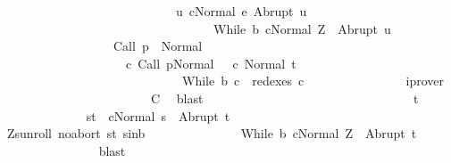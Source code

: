 \begin{isabellebody}
\ \ \ \ \ \ \ \ \ \ \ \ \ \ \ \ \ \ \ \ \ \ \ \ \ \ \ \ {\isacharparenleft}{\isasymforall}u{\isachardot}\ {\isasymGamma}{\isasymturnstile}{\isasymlangle}c{\isacharcomma}Normal\ e{\isasymrangle}\ {\isasymRightarrow}Abrupt\ u\ {\isasymlongrightarrow}\ \isanewline
\ \ \ \ \ \ \ \ \ \ \ \ \ \ \ \ \ \ \ \ \ \ \ \ \ \ \ \ \ \ \ \ \ \ {\isasymGamma}{\isasymturnstile}{\isasymlangle}While\ b\ c{\isacharcomma}Normal\ Z{\isasymrangle}\ {\isasymRightarrow}\ Abrupt\ u{\isacharparenright}{\isacharparenright}\ {\isasymand}\isanewline
\ \ \ \ \ \ \ \ \ \ \ \ \ \ \ \ \ \ {\isasymGamma}{\isasymturnstile}Call\ p\ {\isasymdown}\ Normal\ {\isasymsigma}\ {\isasymand}\isanewline
\ \ \ \ \ \ \ \ \ \ \ \ \ \ \ \ \ \ \ \ {\isacharparenleft}{\isasymexists}c{\isacharprime}{\isachardot}\ {\isasymGamma}{\isasymturnstile}{\isacharparenleft}Call\ p{\isacharcomma}Normal\ {\isasymsigma}{\isacharparenright}\ {\isasymrightarrow}\isactrlsup {\isacharplus}\ {\isacharparenleft}c{\isacharprime}{\isacharcomma}\ Normal\ t{\isacharparenright}\ {\isasymand}\ \isanewline
\ \ \ \ \ \ \ \ \ \ \ \ \ \ \ \ \ \ \ \ \ \ \ \ \ \ \ \ \ While\ b\ c\ {\isasymin}\ redexes\ c{\isacharprime}{\isacharparenright}{\isachardoublequoteclose}\isanewline
\ \ \ \ \ \ \ \ \ \ \ \ \ \ \isamarkupfalse%
\ iprover\isanewline
\ \ \ \ \ \ \ \ \ \ \isacommand{{\isacharbraceright}}\isamarkupfalse%
\isanewline
\ \ \ \ \ \ \ \ \ \ \isamarkupfalse%
\ \isamarkupfalse%
\ {\isacharquery}C{}\ \isamarkupfalse%
\ blast\isanewline
\ \ \ \ \ \ \ \ \isamarkupfalse%
\isanewline
\ \ \ \ \ \ \ \ \ \ \isacommand{{\isacharbraceleft}}\isamarkupfalse%
\isanewline
\ \ \ \ \ \ \ \ \ \ \ \ \isamarkupfalse%
\ t\isanewline
\ \ \ \ \ \ \ \ \ \ \ \ \isamarkupfalse%
\ s{\isacharunderscore}t{\isacharcolon}\ \ {\isachardoublequoteopen}{\isasymGamma}{\isasymturnstile}{\isasymlangle}c{\isacharcomma}Normal\ s{\isasymrangle}\ {\isasymRightarrow}\ Abrupt\ t{\isachardoublequoteclose}\ \isanewline
\ \ \ \ \ \ \ \ \ \ \ \ \isamarkupfalse%
\ Z{\isacharunderscore}s{\isacharunderscore}unroll\ noabort\ s{\isacharunderscore}t\ s{\isacharunderscore}in{\isacharunderscore}b\ \isanewline
\ \ \ \ \ \ \ \ \ \ \ \ \isamarkupfalse%
\ {\isachardoublequoteopen}{\isasymGamma}{\isasymturnstile}{\isasymlangle}While\ b\ c{\isacharcomma}Normal\ Z{\isasymrangle}\ {\isasymRightarrow}\ Abrupt\ t{\isachardoublequoteclose}\isanewline
\ \ \ \ \ \ \ \ \ \ \ \ \ \ \isamarkupfalse%
\ blast\isanewline
\ \ \ \ \ \ \ \ \ \ \isacommand{{\isacharbraceright}}\isamarkupfalse%

\end{isabellebody}

